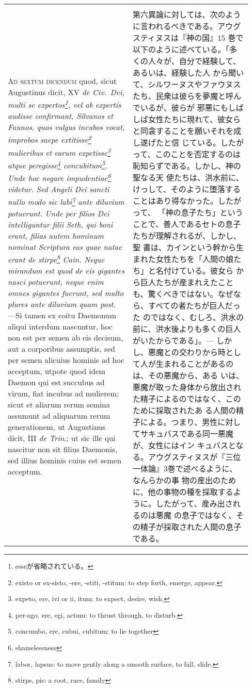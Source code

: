 \documentclass[10pt]{jsarticle} %
\begin{document}
\begin{longtable}{p{21em}p{21em}}
\\\\



{\scshape Ad sextum dicendum} quod, sicut Augustinus dicit, XV {\itshape de
Civ.~Dei}, {\itshape multi se expertos\footnote{esseが省略されている。}, vel ab
expertis audisse confirmant, Silvanos et Faunos, quos vulgus incubos vocat,
improbos saepe extitisse\footnote{existo or ex-sisto, -ere, -stiti, -stitum: to
step forth, emerge, appear.}  mulieribus et earum expetisse\footnote{expeto,
ere, ivi or ii, itum: to expect, desire, wish.} atque
peregisse\footnote{per-ago, ere, egi, actum: to thrust through, to disturb.}
concubitum\footnote{concumbo, ere, cubui, cubitum: to lie together}. Unde hoc
negare impudentiae\footnote{shamelessness} videtur. Sed Angeli Dei sancti nullo
modo sic labi\footnote{labor, lapsus: to move gently along a smooth surface, to
fall, slide.} ante diluvium potuerunt. Unde per filios Dei intelliguntur filii
Seth, qui boni erant, filias autem hominum nominat Scriptura eas quae natae
erant de stirpe\footnote{stirps, pis: a root, race, family} Cain. Neque mirandum
est quod de eis gigantes nasci potuerunt, neque enim omnes gigantes fuerunt, sed
multo plures ante diluvium quam post}. ---Si tamen ex coitu Daemonum aliqui
interdum nascuntur, hoc non est per semen ab eis decisum, aut a corporibus
assumptis, sed per semen alicuius hominis ad hoc acceptum, utpote quod idem
Daemon qui est succubus ad virum, fiat incubus ad mulierem; sicut et aliarum
rerum semina assumunt ad aliquarum rerum generationem, ut Augustinus dicit, III
{\itshape de Trin}.; ut sic ille qui nascitur non sit filius Daemonis, sed
illius hominis cuius est semen acceptum.

&

第六異論に対しては、次のように言われるべきである。アウグスティヌスは『神の国』15
巻で以下のように述べている。「多くの人々が、自分で経験して、あるいは、経験した人
から聞いて、シルワーヌスやファウヌスたち、民衆は彼らを夢魔と呼んでいるが、彼らが
邪悪にもしばしば女性たちに現れて、彼女らと同衾することを願いそれを成し遂げたと信
じている。したがって、このことを否定するのは恥知らずである。しかし、神の聖なる天
使たちは、洪水前に、けっして、そのように堕落することはあり得なかった。したがって、
「神の息子たち」ということで、善人であるセトの息子たちが理解されるが、しかし、聖
書は、カインという幹から生まれた女性たちを「人間の娘たち」と名付けている。彼女ら
から巨人たちが産まれえたことも、驚くべきではない。なぜなら、すべての者たちが巨人だった
のではなく、むしろ、洪水の前に、洪水後よりも多くの巨人がいたからである」。---
しかし、悪魔との交わりから時として人が生まれることがあるのは、その悪魔から、ある
いは、悪魔が取った身体から放出された精子によるのではなく、このために採取されたあ
る人間の精子による。つまり、男性に対してサキュバスである同一悪魔が、女性にはイン
キュバスとなる。アウグスティヌスが『三位一体論』3巻で述べるように、なんらかの事
物の産出のために、他の事物の種を採取するように。したがって、産み出されるのは悪魔
の息子ではなく、その精子が採取された人間の息子である。

\end{longtable}
\end{document}
